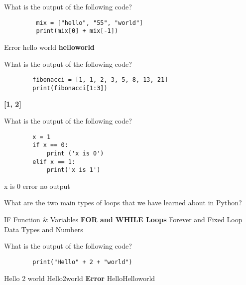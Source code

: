 \documentclass{exam}
\begin{document}
\begin{questions}
    \question What is the output of the following code?

    \begin{verbatim}
         mix = ["hello", "55", "world"]
         print(mix[0] + mix[-1])
    \end{verbatim}
    \begin{oneparchoices}
        \choice Error
        \choice hello world
        \choice \textbf{helloworld}
    \end{oneparchoices}

    \question What is the output of the following code?

    \begin{verbatim}
        fibonacci = [1, 1, 2, 3, 5, 8, 13, 21]
        print(fibonacci[1:3])
    \end{verbatim}
    \begin{oneparchoices}
        \choice [1, 1, 2, 3]
        \choice [1, 2, 3]
        \choice \textbf{[1, 2]}
        \choice [1, 1, 2]
    \end{oneparchoices}

   \question What is the output of the following code?

    \begin{verbatim}
        x = 1
        if x == 0:
            print ('x is 0')
        elif x == 1:
            print('x is 1')

    \end{verbatim}
    \begin{oneparchoices}
        \choice x is 0
        \choice error
        \choice no output
    \end{oneparchoices}

   \question  What are the two main types of loops that we have learned about in Python?

    \begin{oneparchoices}
        \choice IF Function & Variables
        \choice \textbf{FOR and WHILE Loops}
        \choice Forever and Fixed Loop
        \choice Data Types and Numbers
    \end{oneparchoices}
   \question What is the output of the following code?

    \begin{verbatim}
        print("Hello" + 2 + "world")
    \end{verbatim}
    \begin{oneparchoices}
        \chocie Hello 2 world
        \choice Hello2world
        \choice \textbf{Error}
        \choice HelloHelloworld
    \end{oneparchoices}


\end{questions}
\end{document}
